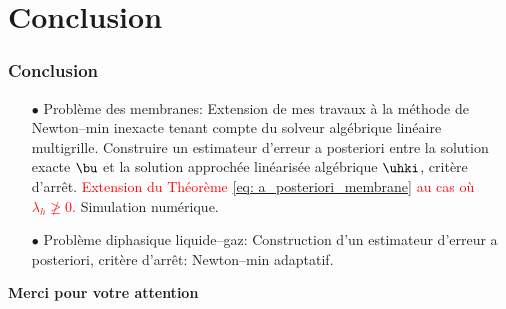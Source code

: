 \documentclass{beamer}
\begin{document}
\section{Conclusion}
\begin{frame}
\frametitle{Conclusion}
\begin{itemize}
\item[$\bullet$] Problème des membranes: Extension de mes travaux à la méthode de Newton--min inexacte tenant compte du solveur algébrique linéaire multigrille. Construire un estimateur d'erreur a posteriori entre la solution exacte $\bu$ et la solution approchée linéarisée algébrique $\uhki$, critère d'arrêt.
\textcolor{red}{Extension du Théorème \eqref{eq: a_posteriori_membrane}  au cas où $\lambda_h \ngeq 0$.} Simulation numérique.
\vspace{1 cm}
\item[$\bullet$] Problème diphasique liquide--gaz:
Construction d'un estimateur d'erreur a posteriori, critère d'arrêt: Newton--min adaptatif.
\end{itemize}
\end{frame}
\begin{frame}
\begin{center}
{\Large \textbf {Merci pour votre attention}}
\end{center}
\end{frame}


\end{document}
